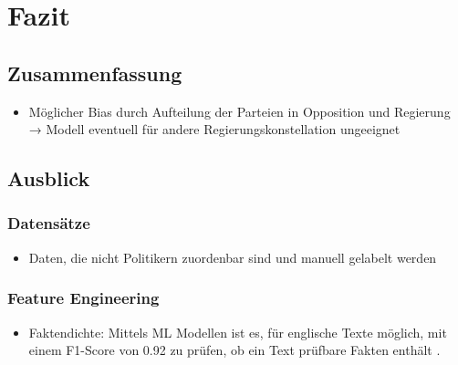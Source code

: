 
\chapter{Fazit} \label{ch:conclusion}

\section{Zusammenfassung}

\begin{itemize}
    \item Möglicher Bias durch Aufteilung der Parteien in Opposition und Regierung → Modell eventuell für andere Regierungskonstellation ungeeignet
\end{itemize}

\section{Ausblick}

\subsection{Datensätze}

\begin{itemize}
    \item Daten, die nicht Politikern zuordenbar sind und manuell gelabelt werden
\end{itemize}

\subsection{Feature Engineering}

\begin{itemize}
    \item Faktendichte: Mittels \ac{ML} Modellen ist es, für englische Texte möglich, mit einem F1-Score von \num{0.92} zu prüfen, ob ein Text prüfbare Fakten enthält \autocite{jha_towards_2023}.
\end{itemize}
